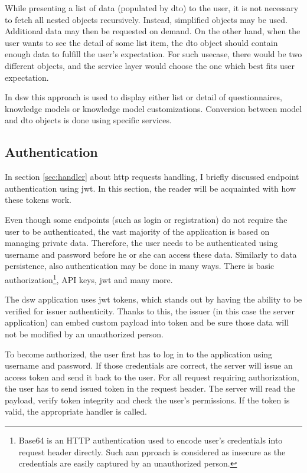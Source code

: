 While presenting a list of data (populated by \gls{dto}) to the user, it is not necessary to fetch all nested objects recursively.
Instead, simplified objects may be used.
Additional data may then be requested on demand.
On the other hand, when the user wants to see the detail of some list item, the \gls{dto} object should contain enough data to fulfill the user's expectation.
For such usecase, there would be two different objects, and the service layer would choose the one which best fits user expectation.


In \gls{dsw} this approach is used to display either list or detail of questionnaires, knowledge models or knowledge model customizations.
Conversion between model and \gls{dto} objects is done using specific services.

\subsection{Authentication}
In section \ref{sec:handler} about \gls{http} requests handling, I briefly discussed endpoint authentication using \gls{jwt}.
In this section, the reader will be acquainted with how these tokens work.

Even though some endpoints (such as login or registration) do not require the user to be authenticated, the vast majority of the application is based on managing private data.
Therefore, the user needs to be authenticated using username and password before he or she can access these data.
Similarly to data persistence, also authentication may be done in many ways.
There is basic authorization\footnote{Base64 is an HTTP authentication used to encode user’s credentials into request header directly. Such aan pproach is considered as insecure as the credentials are easily captured by an unauthorized person\cite{qnimate-base64}.}, API keys, \gls{jwt} and many more.

The \gls{dsw} application uses \gls{jwt} tokens, which stands out by having the ability to be verified for issuer authenticity.
Thanks to this, the issuer (in this case the server application) can embed custom payload into token and be sure those data will not be modified by an unauthorized person.

To become authorized, the user first has to log in to the application using username and password.
If those credentials are correct, the server will issue an access token and send it back to the user.
For all request requiring authorization, the user has to send issued token in the request header.
The server will read the payload, verify token integrity and check the user's permissions.
If the token is valid, the appropriate handler is called.

